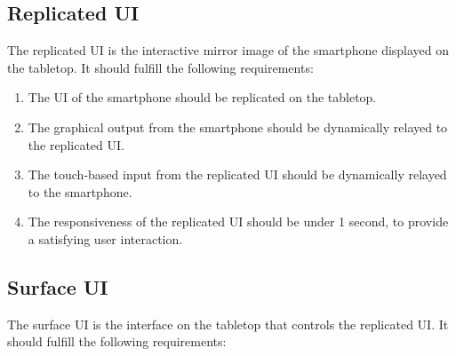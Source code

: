 
\subsection{Replicated UI}

The replicated UI is the interactive mirror image of the smartphone displayed on the tabletop.
It should fulfill the following requirements:

\label{RC}
\begin{enumerate}[{RC}-1]
\item The UI of the smartphone should be replicated on the tabletop.
\item The graphical output from the smartphone should be dynamically relayed to the replicated UI.
\item The touch-based input from the replicated UI should be dynamically relayed to the smartphone.
\item The responsiveness of the replicated UI should be under 1 second, to provide a satisfying user interaction.
\end{enumerate}


\subsection{Surface UI}

The surface UI is the interface on the tabletop that controls the replicated UI.
It should fulfill the following requirements:

